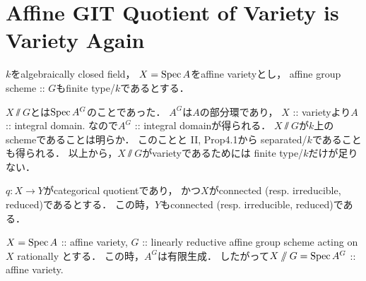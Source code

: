 \documentclass[a4paper]{jsarticle}
\begin{document}
\section{Affine GIT Quotient of Variety is Variety Again }
    $k$をalgebraically closed field，
    $X=\operatorname{Spec} A$をaffine varietyとし，
    affine group scheme :: $G$もfinite type/$k$であるとする．

    $X \sslash G$とは$\operatorname{Spec} A^G$のことであった．
    $A^G$は$A$の部分環であり，
    $X$ :: varietyより$A$ :: integral domain.
    なので$A^G$ :: integral domainが得られる．
    $X \sslash G$が$k$上のschemeであることは明らか．
    このことと\cite{HarAG} II, Prop4.1から
    separated/$k$であることも得られる．
    以上から，$X \sslash G$がvarietyであるためには
    finite type/$k$だけが足りない．

    \begin{Remark}
        $q: X \to Y$がcategorical quotientであり，
        かつ$X$がconnected (resp. irreducible, reduced)であるとする．
        この時，$Y$もconnected (resp. irreducible, reduced)である．
    \end{Remark}

    \begin{Thm}\label{thm:finitetypeGIT}
        $X=\operatorname{Spec} A$ :: affine variety,
        $G$ :: linearly reductive affine group scheme acting on $X$ rationally
        とする．
        この時，$A^G$は有限生成．
        したがって$X \sslash G=\operatorname{Spec} A^G$ :: affine variety.
    \end{Thm}
\end{document}
